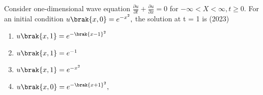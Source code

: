     \item[13.] Consider one-dimensional wave equation $\frac{\partial u}{\partial t}+\frac{\partial u}{\partial x} = 0$ for $-\infty<X<\infty, t\geq 0$. For an initial condition $u\brak{x,0}=e^{-x^2},$ the solution at t = 1 is \hfill (2023)
    \begin{enumerate}[label = (\Alph*)]
        \item $u\brak{x,1}=e^{-\brak{x-1}^2}$
        \item $u\brak{x,1}=e^{-1}$
        \item $u\brak{x,1}=e^{-x^2}$
        \item $u\brak{x,0}=e^{-\brak{x+1}^2},$
    \end{enumerate} 

